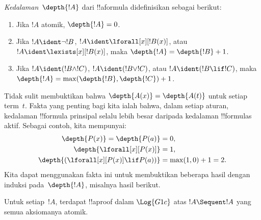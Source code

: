 \documentclass[../../../include/open-logic-section]{subfiles}
\begin{document}
\begin{defn}
\emph{Kedalaman}~$\depth{!A}$ dari !!a{formula} didefinisikan sebagai berikut:
\begin{enumerate}
  \item Jika $!A$ atomik, $\depth{!A} = 0$.
  \item Jika $!A \ident \lnot !B$, $!A \ident \lforall[x][!B(x)]$,
  atau $!A \ident \lexists[x][!B(x)]$, maka $\depth{!A} = \depth{!B} + 1$.
  \item Jika $!A \ident (!B \land !C)$, $!A \ident (!B \lor !C)$, atau
  $!A \ident (!B \lif !C)$, maka $\depth{!A} =
  \max(\depth{!B},\depth{!C}) + 1$.
\end{enumerate}
\end{defn}

Tidak sulit membuktikan bahwa $\depth{A(x)} = \depth{A(t)}$ untuk setiap
term~$t$. Fakta yang penting bagi kita ialah bahwa, dalam setiap aturan,
kedalaman !!{formula} prinsipal selalu lebih besar daripada kedalaman
!!{formula}s aktif. Sebagai contoh, kita mempunyai:
\begin{align*}
\depth{P(x)} = \depth{P(a)} & = 0,\\
\depth{\lforall[x][P(x)]} & = 1,\\
\depth{(\lforall[x][P(x)] \lif P(a))} & = \max(1,0) + 1 = 2.
\end{align*}
Kita dapat menggunakan fakta ini untuk membuktikan beberapa hasil dengan
induksi pada~$\depth{!A}$, misalnya hasil berikut.

\begin{prop}
Untuk setiap~$!A$, terdapat !!a{proof} dalam $\Log{G1c}$ atas $!A
\Sequent !A$ yang semua aksiomanya atomik.
\end{prop}
\end{document}
